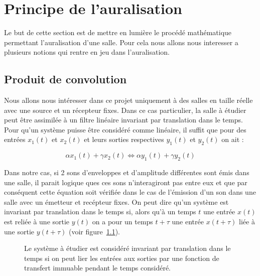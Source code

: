\chapter{Principe de l'auralisation}

Le but de cette section est de mettre en lumière le procédé mathématique permettant l'auralisation d'une salle. Pour cela nous allons nous interesser a plusieurs notions qui rentre en jeu dans l'auralisation.

\section{Produit de convolution} %

Nous allons nous intéresser dans ce projet uniquement à des salles en taille réelle avec une source et un récepteur fixes. Dans ce cas particulier, la salle à étudier peut être assimilée à un filtre linéaire invariant par translation dans le temps. 
Pour qu'un système puisse être considéré comme linéaire, il suffit que pour des entrées $x_1(t)$ et $x_2(t)$ et leurs sorties respectives $y_1(t)$ et $y_2(t)$ on ait :
    
\begin{equation}
    \alpha x_1(t) + \gamma x_2(t) \Leftrightarrow \alpha y_1(t) + \gamma y_2(t)
\end{equation}

Dans notre cas, si 2 sons d'enveloppes et d'amplitude différentes sont émis dans une salle, il parait logique ques ces sons n'interagiront pas entre eux et que par conséquent cette équation soit vérifiée dans le cas de l'émission d'un son dans une salle avec un émetteur et recépteur fixes.
On peut dire qu'un système est invariant par translation dans le temps si, alors qu'à un temps $t$ une entrée $x(t)$ est reliée à une sortie $y(t)$ on a pour un temps $t+\tau$ une entrée $x(t+\tau)$ liée à une sortie $y(t+\tau)$ (voir figure~\ref{systeme_invariant}).

\begin{figure}[h!]
    \caption{\label{systeme_invariant} Le système à étudier est considéré invariant par translation dans le temps si on peut lier les entrées aux sorties par une fonction de transfert immuable pendant le temps considéré.}
\end{figure}

